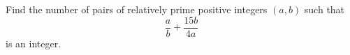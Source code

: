 Find the number of pairs of relatively prime positive integers $(a,b)$ such that
\[
\dfrac {a}{b}+\dfrac{15b}{4a}
\]
is an integer.
